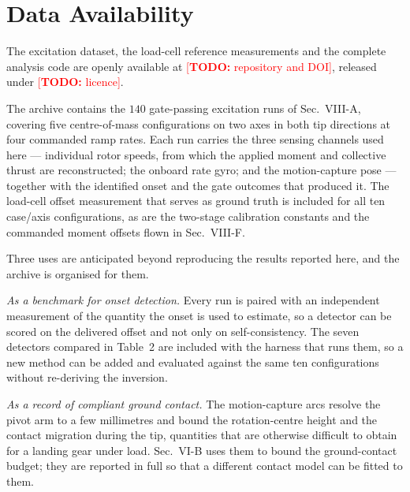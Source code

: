 \documentclass[10pt]{article}
\begin{document}
%

\providecommand{\TODO}[1]{\textcolor{red}{[\textbf{TODO:} #1]}}

\section*{Data Availability}

The excitation dataset, the load-cell reference measurements and the
complete analysis code are openly available at
\TODO{repository and DOI}, released under \TODO{licence}.

The archive contains the $140$ gate-passing excitation runs of
Sec.~VIII-A, covering five centre-of-mass configurations on two axes in
both tip directions at four commanded ramp rates. Each run carries the
three sensing channels used here --- individual rotor speeds, from
which the applied moment and collective thrust are reconstructed; the
onboard rate gyro; and the motion-capture pose --- together with the
identified onset and the gate outcomes that produced it. The load-cell
offset measurement that serves as ground truth is included for all ten
case/axis configurations, as are the two-stage calibration constants
and the commanded moment offsets flown in Sec.~VIII-F.

Three uses are anticipated beyond reproducing the results reported
here, and the archive is organised for them.

\emph{As a benchmark for onset detection.} Every run is paired with an
independent measurement of the quantity the onset is used to estimate,
so a detector can be scored on the delivered offset and not only on
self-consistency. The seven detectors compared in
Table~2 are included with the harness that runs them, so
a new method can be added and evaluated against the same ten
configurations without re-deriving the inversion.

\emph{As a record of compliant ground contact.} The motion-capture arcs
resolve the pivot arm to a few millimetres and bound the rotation-centre
height and the contact migration during the tip, quantities that are
otherwise difficult to obtain for a landing gear under load. Sec.~VI-B
uses them to bound the ground-contact budget; they are reported in full
so that a different contact model can be fitted to them.
\end{document}
